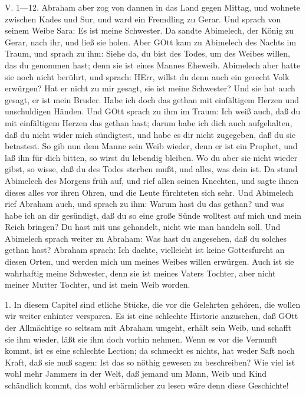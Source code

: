 \begin{schriftzitat}
V. 1—12. Abraham aber zog von dannen in das Land gegen Mittag, und wohnete zwischen Kades und Sur, und ward ein Fremdling zu Gerar. Und sprach von seinem Weibe Sara: Es ist meine Schwester. Da sandte Abimelech, der König zu Gerar, nach ihr, und ließ sie holen. Aber GOtt kam zu Abimelech des Nachts im Traum, und sprach zu ihm: Siehe da, du bist des Todes, um des Weibes willen, das du genommen hast; denn sie ist eines Mannes Eheweib. Abimelech aber hatte sie noch nicht berührt, und sprach: HErr, willst du denn auch ein gerecht Volk erwürgen? Hat er nicht zu mir gesagt, sie ist meine Schwester? Und sie hat auch gesagt, er ist mein Bruder. Habe ich doch das gethan mit einfältigem Herzen und unschuldigen Händen. Und GOtt sprach zu ihm im Traum: Ich weiß auch, daß du mit einfältigem Herzen das gethan hast; darum habe ich dich auch aufgehalten, daß du nicht wider mich sündigtest, und habe es dir nicht zugegeben, daß du sie betastest. So gib nun dem Manne sein Weib wieder, denn er ist ein Prophet, und laß ihn für dich bitten, so wirst du lebendig bleiben. Wo du aber sie nicht wieder gibst, so wisse, daß du des Todes sterben mußt, und alles, was dein ist. Da stund Abimelech des Morgens früh auf, und rief allen seinen Knechten, und sagte ihnen dieses alles vor ihren Ohren, und die Leute fürchteten sich sehr. Und Abimelech rief Abraham auch, und sprach zu ihm: Warum hast du das gethan? und was habe ich an dir gesündigt, daß du so eine große Sünde wolltest auf mich und mein Reich bringen? Du hast mit uns gehandelt, nicht wie man handeln soll. Und Abimelech sprach weiter zu Abraham: Was hast du angesehen, daß du solches gethan hast? Abraham sprach: Ich dachte, vielleicht ist keine Gottesfurcht an diesen Orten, und werden
mich um meines Weibes willen erwürgen. Auch ist sie wahrhaftig meine Schwester, denn sie ist meines Vaters Tochter, aber nicht meiner Mutter Tochter, und ist mein Weib worden.
\end{schriftzitat}

1. In diesem Capitel sind etliche Stücke, die vor die Gelehrten gehören, die wollen wir weiter enhinter versparen. Es ist eine schlechte Historie anzusehen, daß GOtt der Allmächtige so seltsam mit Abraham umgeht, erhält sein Weib, und schafft sie ihm wieder, läßt sie ihm doch vorhin nehmen. Wenn es vor die Vernunft kommt, ist es eine schlechte Lection; da schmeckt es nichts, hat weder Saft noch Kraft, daß sie muß sagen: Ist das so nöthig gewesen zu beschreiben? Wie viel ist wohl mehr Jammers in der Welt, daß jemand um Mann, Weib und Kind schändlich kommt, das wohl erbärmlicher zu lesen wäre denn diese Geschichte!

